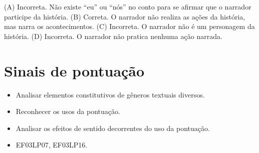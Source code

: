 
(A) Incorreta. Não existe ``eu'' ou ``nós'' no conto para se afirmar
que o narrador participe da história.
(B) Correta. O narrador não realiza as ações da história, mas narra os
acontecimentos.
(C) Incorreta. O narrador não é um personagem da história.
(D) Incorreta. O narrador não pratica nenhuma ação narrada.

\chapter{Sinais de pontuação}



\begin{itemize}
  \item Analisar elementos constitutivos de gêneros textuais diversos.
  \item Reconhecer os usos da pontuação.
  \item Analisar os efeitos de sentido decorrentes do uso da pontuação.
\end{itemize}


\begin{itemize}
  \item EF03LP07, EF03LP16.
\end{itemize}

